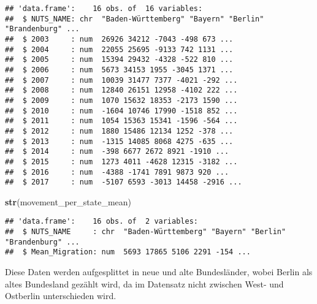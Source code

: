\documentclass[]{article}
\newenvironment{Shaded}{\begin{snugshade}}{\end{snugshade}}
\newcommand{\KeywordTok}[1]{\textcolor[rgb]{0.13,0.29,0.53}{\textbf{#1}}}
\newcommand{\NormalTok}[1]{#1}
\newcommand{\StringTok}[1]{\textcolor[rgb]{0.31,0.60,0.02}{#1}}
\begin{document}
\begin{verbatim}
## 'data.frame':    16 obs. of  16 variables:
##  $ NUTS_NAME: chr  "Baden-Württemberg" "Bayern" "Berlin" "Brandenburg" ...
##  $ 2003     : num  26926 34212 -7043 -498 673 ...
##  $ 2004     : num  22055 25695 -9133 742 1131 ...
##  $ 2005     : num  15394 29432 -4328 -522 810 ...
##  $ 2006     : num  5673 34153 1955 -3045 1371 ...
##  $ 2007     : num  10039 31477 7377 -4021 -292 ...
##  $ 2008     : num  12840 26151 12958 -4102 222 ...
##  $ 2009     : num  1070 15632 18353 -2173 1590 ...
##  $ 2010     : num  -1604 10746 17990 -1518 852 ...
##  $ 2011     : num  1054 15363 15341 -1596 -564 ...
##  $ 2012     : num  1880 15486 12134 1252 -378 ...
##  $ 2013     : num  -1315 14085 8068 4275 -635 ...
##  $ 2014     : num  -398 6677 2672 8921 -1910 ...
##  $ 2015     : num  1273 4011 -4628 12315 -3182 ...
##  $ 2016     : num  -4388 -1741 7891 9873 920 ...
##  $ 2017     : num  -5107 6593 -3013 14458 -2916 ...
\end{verbatim}

\begin{Shaded}
\begin{Highlighting}[]
\KeywordTok{str}\NormalTok{(movement_per_state_mean)}
\end{Highlighting}
\end{Shaded}

\begin{verbatim}
## 'data.frame':    16 obs. of  2 variables:
##  $ NUTS_NAME     : chr  "Baden-Württemberg" "Bayern" "Berlin" "Brandenburg" ...
##  $ Mean_Migration: num  5693 17865 5106 2291 -154 ...
\end{verbatim}

Diese Daten werden aufgesplittet in neue und alte Bundesländer, wobei
Berlin als altes Bundesland gezählt wird, da im Datensatz nicht zwischen
West- und Ostberlin unterschieden wird.

\begin{Shaded}
\end{Shaded}
\end{document}
